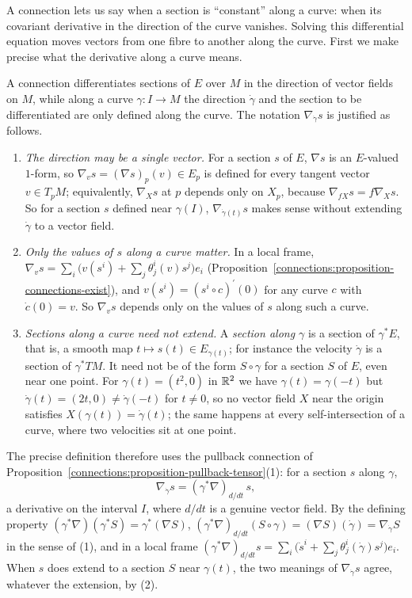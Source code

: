 A connection lets us say when a section is ``constant'' along a curve: when its covariant derivative in the direction of the curve vanishes. Solving this differential
equation moves vectors from one fibre to another along the curve. First we make precise what the derivative along a curve means.

\begin{remark}\label{connections:remark-along-curves}
A connection differentiates sections of $E$ over $M$ in the direction of vector fields on $M$, while along a curve $\gamma \colon I \to M$ the direction $\dot\gamma$ and
the section to be differentiated are only defined along the curve. The notation $\nabla_{\dot\gamma}s$ is justified as follows.
\begin{enumerate}
\item \emph{The direction may be a single vector.} For a section $s$ of $E$, $\nabla s$ is an $E$-valued $1$-form, so $\nabla_vs = (\nabla s)_p(v) \in E_p$ is defined for
every tangent vector $v \in T_pM$; equivalently, $\nabla_Xs$ at $p$ depends only on $X_p$, because $\nabla_{fX}s = f\nabla_Xs$. So for a section $s$ defined near
$\gamma(I)$, $\nabla_{\dot\gamma(t)}s$ makes sense without extending $\dot\gamma$ to a vector field.
\item \emph{Only the values of $s$ along a curve matter.} In a local frame, $\nabla_vs = \sum_i\bigl(v(s^i) + \sum_j\theta^i_j(v)s^j\bigr)e_i$
(Proposition~\ref{connections:proposition-connections-exist}), and $v(s^i) = (s^i \circ c)^{\prime}(0)$ for any curve $c$ with $\dot c(0) = v$. So $\nabla_vs$ depends
only on the values of $s$ along such a curve.
\item \emph{Sections along a curve need not extend.} A \emph{section along $\gamma$} is a section of $\gamma^*E$, that is, a smooth map $t \mapsto s(t) \in E_{\gamma(t)}$;
for instance the velocity $\dot\gamma$ is a section of $\gamma^*TM$. It need not be of the form $S \circ \gamma$ for a section $S$ of $E$, even near one point. For
$\gamma(t) = (t^2, 0)$ in $\mathbb{R}^2$ we have $\gamma(t) = \gamma(-t)$ but $\dot\gamma(t) = (2t, 0) \neq \dot\gamma(-t)$ for $t \neq 0$, so no vector field $X$ near the origin
satisfies $X(\gamma(t)) = \dot\gamma(t)$; the same happens at every self-intersection of a curve, where two velocities sit at one point.
\end{enumerate}
The precise definition therefore uses the pullback connection of Proposition~\ref{connections:proposition-pullback-tensor}(1): for a section $s$ along $\gamma$,
\[
\nabla_{\dot\gamma}s = (\gamma^*\nabla)_{d/dt}\,s ,
\]
a derivative on the interval $I$, where $d/dt$ is a genuine vector field. By the defining property $(\gamma^*\nabla)(\gamma^*S) = \gamma^*(\nabla S)$,
$(\gamma^*\nabla)_{d/dt}(S \circ \gamma) = (\nabla S)(\dot\gamma) = \nabla_{\dot\gamma}S$ in the sense of (1), and in a local frame
$(\gamma^*\nabla)_{d/dt}s = \sum_i\bigl(\dot s^i + \sum_j\theta^i_j(\dot\gamma)s^j\bigr)e_i$. When $s$ does extend to a section $S$ near $\gamma(t)$, the two meanings of
$\nabla_{\dot\gamma}s$ agree, whatever the extension, by (2).
\end{remark}

